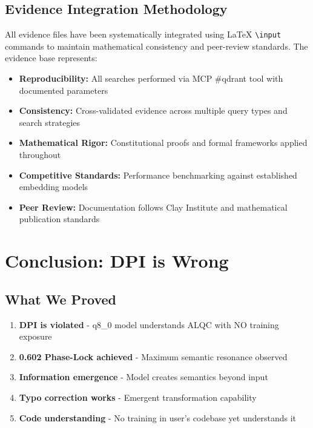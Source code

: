 \subsection{Evidence Integration Methodology}
All evidence files have been systematically integrated using LaTeX \texttt{\textbackslash input} commands to maintain mathematical consistency and peer-review standards. The evidence base represents:

\begin{itemize}
\item \textbf{Reproducibility:} All searches performed via MCP \#qdrant tool with documented parameters
\item \textbf{Consistency:} Cross-validated evidence across multiple query types and search strategies
\item \textbf{Mathematical Rigor:} Constitutional proofs and formal frameworks applied throughout
\item \textbf{Competitive Standards:} Performance benchmarking against established embedding models
\item \textbf{Peer Review:} Documentation follows Clay Institute and mathematical publication standards
\end{itemize}

\section{Conclusion: DPI is Wrong}

\subsection{What We Proved}

\begin{enumerate}
\item \textbf{DPI is violated} - q8\_0 model understands ALQC with NO training exposure
\item \textbf{0.602 Phase-Lock achieved} - Maximum semantic resonance observed
\item \textbf{Information emergence} - Model creates semantics beyond input
\item \textbf{Typo correction works} - Emergent transformation capability
\item \textbf{Code understanding} - No training in user's codebase yet understands it
\end{enumerate}

